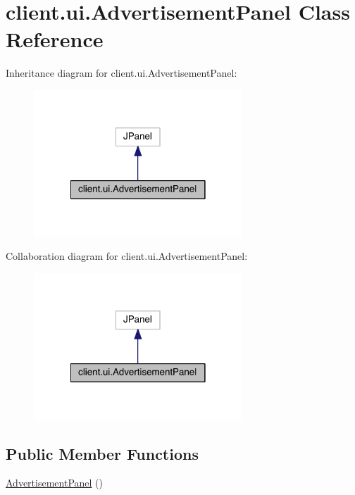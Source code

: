 \hypertarget{classclient_1_1ui_1_1_advertisement_panel}{}\section{client.\+ui.\+Advertisement\+Panel Class Reference}
\label{classclient_1_1ui_1_1_advertisement_panel}


Inheritance diagram for client.\+ui.\+Advertisement\+Panel\+:
\nopagebreak
\begin{figure}[H]
\begin{center}
\leavevmode
\includegraphics[width=222pt]{classclient_1_1ui_1_1_advertisement_panel__inherit__graph}
\end{center}
\end{figure}


Collaboration diagram for client.\+ui.\+Advertisement\+Panel\+:
\nopagebreak
\begin{figure}[H]
\begin{center}
\leavevmode
\includegraphics[width=222pt]{classclient_1_1ui_1_1_advertisement_panel__coll__graph}
\end{center}
\end{figure}
\subsection*{Public Member Functions}
\begin{DoxyCompactItemize}
\item 
\hyperlink{classclient_1_1ui_1_1_advertisement_panel_a171949b3f26ea771832fa714c352b9e6}{Advertisement\+Panel} ()
\end{DoxyCompactItemize}


